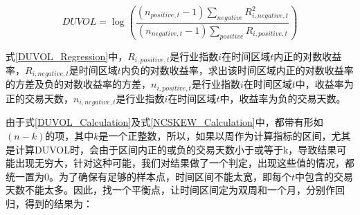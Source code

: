 \documentclass{sysuthesis}
\begin{document}
\begin{equation}
\label{DUVOL_Calculation}
DUVOL = \log (\frac{{({n_{positive,t}} - 1)\sum\limits_{negative} {R_{i,negative,t}^2} }}{{({n_{negative,t}} - 1)\sum\limits_{positive} {{R_{i,positive,t}}} }})
\end{equation}

式\ref{DUVOL_Regression}中，$R_{i,positive,t}$是行业指数$i$在时间区域$t$内正的对数收益率，$R_{i,negative,t}$是时间区域$t$内负的对数收益率，求出该时间区域内正的对数收益率的方差及负的对数收益率的方差，$n_{i,positive,t}$是行业指数$i$在时间区域$t$中，收益率为正的交易天数，$n_{i,negative,t}$是行业指数$i$在时间区域$t$中，收益率为负的交易天数。

由于式\ref{DUVOL_Calculation}及式\ref{NCSKEW_Calculation}中，都带有形如$(n-k)$的项，其中$k$是一个正整数，所以，如果以周作为计算指标的区间，尤其是计算DUVOL时，会由于区间内正的或负的交易天数小于或等于k，导致结果可能出现无穷大，针对这种可能，我们对结果做了一个判定，出现这些值的情况，都统一置为0。为了确保有足够的样本点，时间区间不能太宽，即每个$t$中包含的交易天数不能太多。因此，找一个平衡点，让时间区间定为双周和一个月，分别作回归，得到的结果为：
\end{document}

